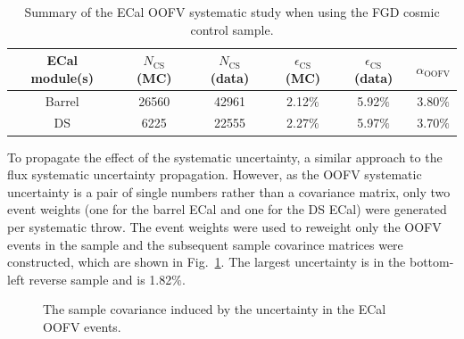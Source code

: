\begin{table}
  \begin{tabular}{ c c c c c c }
    ECal module(s) & $N_{\textrm{CS}}$ (MC) & $N_{\textrm{CS}}$ (data) & $\epsilon_{\textrm{CS}}$ (MC) & $\epsilon_{\textrm{CS}}$ (data) & $\alpha_{\textrm{OOFV}}$ \\ \hline \hline
    Barrel & 26560 & 42961 & 2.12$\%$ & 5.92$\%$ & 3.80$\%$ \\
    DS & 6225 & 22555 & 2.27$\%$ & 5.97$\%$ & 3.70$\%$ \\
  \end{tabular}
  \caption{Summary of the ECal OOFV systematic study when using the FGD cosmic control sample.}
  \label{table:OOFVSystematicSummary}
\end{table}
\newline
\newline
To propagate the effect of the systematic uncertainty, a similar approach to the flux systematic uncertainty propagation.  However, as the OOFV systematic uncertainty is a pair of single numbers rather than a covariance matrix, only two event weights (one for the barrel ECal and one for the DS ECal) were generated per systematic throw.  The event weights were used to reweight only the OOFV events in the sample and the subsequent sample covarince matrices were constructed, which are shown in Fig.~\ref{fig:ECalOOFVCovarianceMatrices}.  The largest uncertainty is in the bottom-left reverse sample and is 1.82$\%$.
\begin{figure}%
  \centering
  \caption{The sample covariance induced by the uncertainty in the ECal OOFV events.}
  \label{fig:ECalOOFVCovarianceMatrices}
\end{figure}
